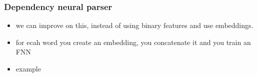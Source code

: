 \documentclass[11pt]{article}
\begin{document}
\subsubsection{Dependency neural parser}

\begin{minipage}[l]{.5\linewidth}
    \begin{figure}[H]
        \centering
    \end{figure}    
\end{minipage}\hfill
\begin{minipage}[r]{.48\linewidth}
    \begin{itemize}
        \item we can improve on this, instead of using binary features and use embeddings.
        \item for ecah word you create an embedding, you concatenate it and you train an FNN
    \end{itemize}
\end{minipage}

\begin{minipage}[l]{.5\linewidth}
    \begin{figure}[H]
        \centering
    \end{figure}    
\end{minipage}\hfill
\begin{minipage}[r]{.48\linewidth}
    \begin{itemize}
        \item example
    \end{itemize}
\end{minipage}
\end{document}
